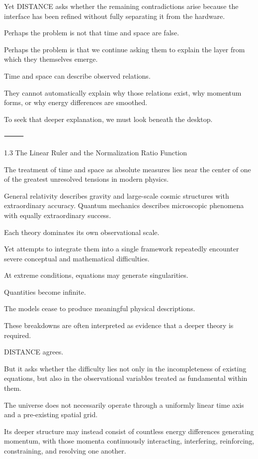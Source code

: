 Yet DISTANCE asks whether the remaining contradictions arise because the interface has been refined without fully separating it from the hardware.

Perhaps the problem is not that time and space are false.

Perhaps the problem is that we continue asking them to explain the layer from which they themselves emerge.

Time and space can describe observed relations.

They cannot automatically explain why those relations exist, why momentum forms, or why energy differences are smoothed.

To seek that deeper explanation, we must look beneath the desktop.

⸻

1.3 The Linear Ruler and the Normalization Ratio Function

The treatment of time and space as absolute measures lies near the center of one of the greatest unresolved tensions in modern physics.

General relativity describes gravity and large-scale cosmic structures with extraordinary accuracy. Quantum mechanics describes microscopic phenomena with equally extraordinary success.

Each theory dominates its own observational scale.

Yet attempts to integrate them into a single framework repeatedly encounter severe conceptual and mathematical difficulties.

At extreme conditions, equations may generate singularities.

Quantities become infinite.

The models cease to produce meaningful physical descriptions.

These breakdowns are often interpreted as evidence that a deeper theory is required.

DISTANCE agrees.

But it asks whether the difficulty lies not only in the incompleteness of existing equations, but also in the observational variables treated as fundamental within them.

The universe does not necessarily operate through a uniformly linear time axis and a pre-existing spatial grid.

Its deeper structure may instead consist of countless energy differences generating momentum, with those momenta continuously interacting, interfering, reinforcing, constraining, and resolving one another.

